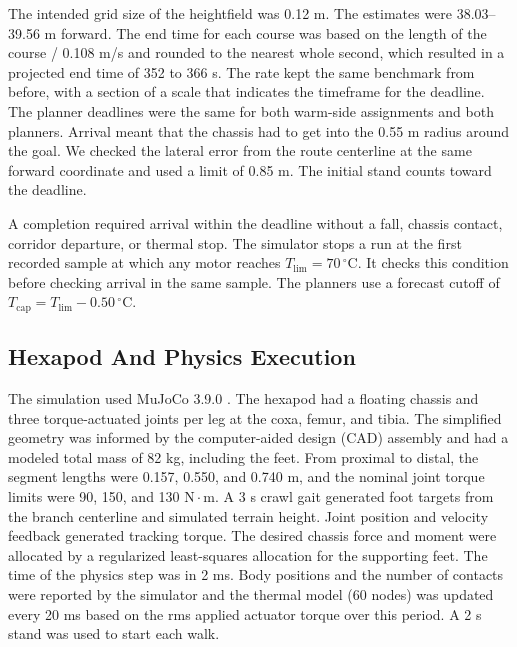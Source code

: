\documentclass{ieeeaccess}
\begin{document}
The intended grid size of the heightfield was 0.12 m. The estimates were 38.03--39.56 m forward. The end time for each course was based on the length of the course / 0.108 m/s and rounded to the nearest whole second, which resulted in a projected end time of 352 to 366 s. The rate kept the same benchmark from before, with a section of a scale that indicates the timeframe for the deadline. The planner deadlines were the same for both warm-side assignments and both planners. Arrival meant that the chassis had to get into the 0.55 m radius around the goal. We checked the lateral error from the route centerline at the same forward coordinate and used a limit of 0.85 m. The initial stand counts toward the deadline.

A completion required arrival within the deadline without a fall, chassis contact, corridor departure, or thermal stop. The simulator stops a run at the first recorded sample at which any motor reaches $T_{\mathrm{lim}}=70\,{}^\circ\mathrm{C}$. It checks this condition before checking arrival in the same sample. The planners use a forecast cutoff of $T_{\mathrm{cap}}=T_{\mathrm{lim}}-0.50\,{}^\circ\mathrm{C}$.

\subsection{Hexapod And Physics Execution}

The simulation used MuJoCo 3.9.0 \cite{todorov2012}. The hexapod had a floating chassis and three torque-actuated joints per leg at the coxa, femur, and tibia. The simplified geometry was informed by the computer-aided design (CAD) assembly and had a modeled total mass of 82 kg, including the feet. From proximal to distal, the segment lengths were 0.157, 0.550, and 0.740 m, and the nominal joint torque limits were 90, 150, and 130 $\mathrm{N}{\cdot}\mathrm{m}$. A 3 s crawl gait generated foot targets from the branch centerline and simulated terrain height. Joint position and velocity feedback generated tracking torque. The desired chassis force and moment were allocated by a regularized least-squares allocation for the supporting feet. The time of the physics step was in 2 ms. Body positions and the number of contacts were reported by the simulator and the thermal model (60 nodes) was updated every 20 ms based on the rms applied actuator torque over this period. A 2 s stand was used to start each walk.
\end{document}
